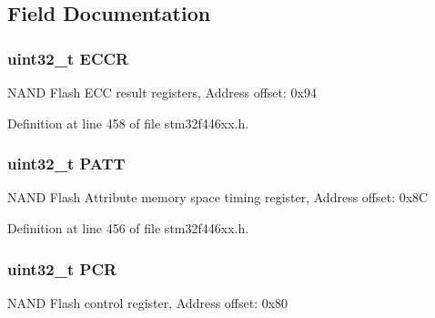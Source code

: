 \subsection{Field Documentation}
\subsubsection[{\texorpdfstring{E\+C\+CR}{ECCR}}]{ uint32\+\_\+t E\+C\+CR}\hypertarget{struct_f_m_c___bank3___type_def_abe203f827d2e33c7f162e4170b6dfdb3}{}\label{struct_f_m_c___bank3___type_def_abe203f827d2e33c7f162e4170b6dfdb3}
N\+A\+ND Flash E\+CC result registers, Address offset\+: 0x94 

Definition at line 458 of file stm32f446xx.\+h.

\subsubsection[{\texorpdfstring{P\+A\+TT}{PATT}}]{ uint32\+\_\+t P\+A\+TT}\hypertarget{struct_f_m_c___bank3___type_def_ae95cf98e0ba3414c3d66385b677fcbf1}{}\label{struct_f_m_c___bank3___type_def_ae95cf98e0ba3414c3d66385b677fcbf1}
N\+A\+ND Flash Attribute memory space timing register, Address offset\+: 0x8C 

Definition at line 456 of file stm32f446xx.\+h.

\subsubsection[{\texorpdfstring{P\+CR}{PCR}}]{ uint32\+\_\+t P\+CR}\hypertarget{struct_f_m_c___bank3___type_def_a6091bd215b74df162dd3bc51621c63ca}{}\label{struct_f_m_c___bank3___type_def_a6091bd215b74df162dd3bc51621c63ca}
N\+A\+ND Flash control register, Address offset\+: 0x80 


